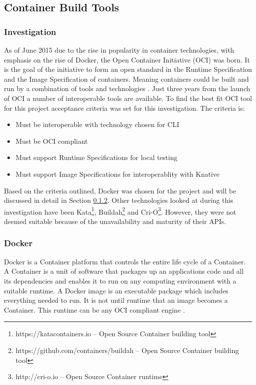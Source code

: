 \subsection{Container Build Tools}
\subsubsection{Investigation}
\label{sub:build_invest}
As of June 2015 due to the rise in popularity in container technologies, with emphasis on the rise of \gls{Docker}, the Open Container Initiative (\gls{OCI}) was born. It is the goal of the initiative to form an open standard in the Runtime Specification and the Image Specification of containers. Meaning containers could be built and run by a combination of tools and technologies \citep{oci}. 
Just three years from the launch of \gls{OCI} a number of interoperable tools are available. To find the best fit \gls{OCI} tool for this project acceptance criteria was set for this investigation. The criteria is: 
\begin{itemize}
    \item Must be interoperable with technology chosen for \gls{CLI}
    \item Must be OCI compliant
    \item Must support Runtime Specifications for local testing
    \item Must support Image Specifications for interoperablity with \gls{Knative}
\end{itemize}
Based on the criteria outlined, \gls{Docker} was chosen for the project and will be discussed in detail in Section \ref{sub:docker}. Other technologies looked at during this investigation have been \gls{Kata}\footnote{https://katacontainers.io -- Open Source Container building tool}, \gls{Buildah}\footnote{https://github.com/containers/buildah -- Open Source Container building tool} and \gls{Cri-O}\footnote{http://cri-o.io -- Open Source Container runtime}. However, they were not deemed suitable because of the unavailability and maturity of their \gls{API}s.

\subsubsection{Docker}
\label{sub:docker}
\gls{Docker} is a \gls{Container} platform that controls the entire life cycle of a \gls{Container}. A \gls{Container} is a unit of software that packages up an applications code and all its dependencies and enables it to run on any computing environment with a suitable runtime. A \gls{Docker} image is an executable package which includes everything needed to run. It is not until runtime that an image becomes a \gls{Container}. This runtime can be any \gls{OCI} compliant engine \citep{docker}.

